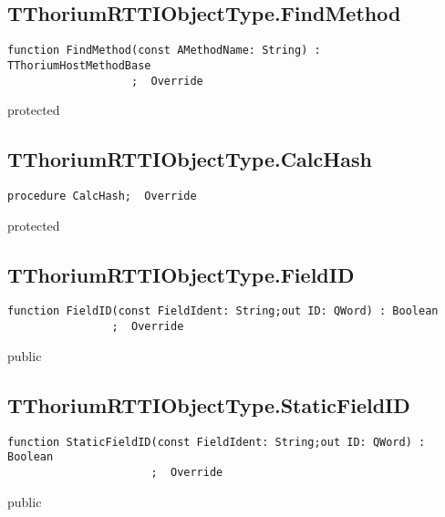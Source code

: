 \subsection{TThoriumRTTIObjectType.FindMethod}
\label{thoriumcorepkg:thorium:tthoriumrttiobjecttype:findmethod}
\begin{FPCList}
\Declaration 

\begin{verbatim}
function FindMethod(const AMethodName: String) : TThoriumHostMethodBase
                   ;  Override
\end{verbatim}
\Visibility
protected
\end{FPCList}
\subsection{TThoriumRTTIObjectType.CalcHash}
\label{thoriumcorepkg:thorium:tthoriumrttiobjecttype:calchash}
\begin{FPCList}
\Declaration 

\begin{verbatim}
procedure CalcHash;  Override
\end{verbatim}
\Visibility
protected
\end{FPCList}
\subsection{TThoriumRTTIObjectType.FieldID}
\label{thoriumcorepkg:thorium:tthoriumrttiobjecttype:fieldid}
\begin{FPCList}
\Declaration 

\begin{verbatim}
function FieldID(const FieldIdent: String;out ID: QWord) : Boolean
                ;  Override
\end{verbatim}
\Visibility
public
\end{FPCList}
\subsection{TThoriumRTTIObjectType.StaticFieldID}
\label{thoriumcorepkg:thorium:tthoriumrttiobjecttype:staticfieldid}
\begin{FPCList}
\Declaration 

\begin{verbatim}
function StaticFieldID(const FieldIdent: String;out ID: QWord) : Boolean
                      ;  Override
\end{verbatim}
\Visibility
public
\end{FPCList}
